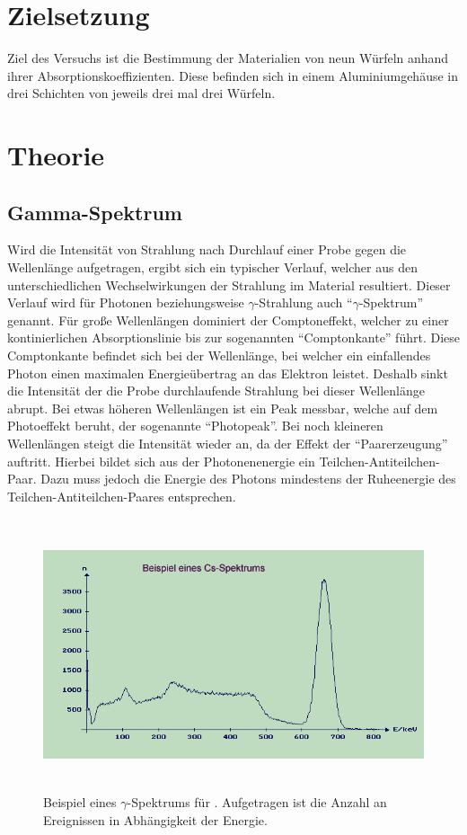 \section{Zielsetzung}
\label{sec:Zielsetzung}

Ziel des Versuchs ist die Bestimmung der Materialien von neun Würfeln
anhand ihrer Absorptionskoeffizienten.
Diese befinden sich in einem Aluminiumgehäuse in drei Schichten von
jeweils drei mal drei Würfeln.

\section{Theorie}
\label{sec:Theorie}

\subsection{Gamma-Spektrum}
\label{sec:GammaSpektrum}

Wird die Intensität von Strahlung nach Durchlauf einer Probe gegen die Wellenlänge
aufgetragen, ergibt sich ein typischer Verlauf, welcher aus den unterschiedlichen
Wechselwirkungen der Strahlung im Material resultiert.
Dieser Verlauf wird für Photonen beziehungsweise $\gamma$-Strahlung
auch \enquote{$\gamma$-Spektrum} genannt.
Für große Wellenlängen dominiert der Comptoneffekt,
welcher zu einer kontinierlichen Absorptionslinie
bis zur sogenannten \enquote{Comptonkante} führt.
Diese Comptonkante befindet sich bei der Wellenlänge,
bei welcher ein einfallendes Photon einen maximalen
Energieübertrag an das Elektron leistet.
Deshalb sinkt die Intensität der die Probe durchlaufende Strahlung
bei dieser Wellenlänge abrupt.
Bei etwas höheren Wellenlängen ist ein Peak messbar,
welche auf dem Photoeffekt beruht, der sogenannte \enquote{Photopeak}.
Bei noch kleineren Wellenlängen steigt die Intensität wieder an,
da der Effekt der \enquote{Paarerzeugung} auftritt.
Hierbei bildet sich aus der Photonenenergie ein Teilchen-Antiteilchen-Paar.
Dazu muss jedoch die Energie des Photons mindestens der Ruheenergie
des Teilchen-Antiteilchen-Paares entsprechen.

\begin{figure}
  \centering
  \includegraphics[height=8.0cm]{content/Energiespektrum.jpg}
  \caption{Beispiel eines $\gamma$-Spektrums für  \cite{hans}.
  Aufgetragen ist die Anzahl an Ereignissen in Abhängigkeit der Energie.}
  \label{fig:spektrum}
\end{figure}

